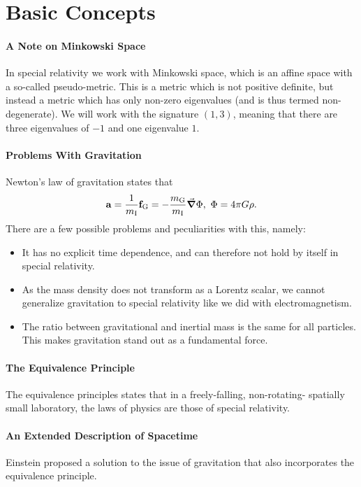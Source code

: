 \section{Basic Concepts}

\paragraph{A Note on Minkowski Space}
In special relativity we work with Minkowski space, which is an affine space with a so-called pseudo-metric. This is a metric which is not positive definite, but instead a metric which has only non-zero eigenvalues (and is thus termed non-degenerate). We will work with the signature $(1, 3)$, meaning that there are three eigenvalues of $-1$ and one eigenvalue $1$.

\paragraph{Problems With Gravitation}
Newton's law of gravitation states that
\begin{align*}
	\vb{a} = \frac{1}{m_{\text{I}}}\vb{f}_{\text{G}} = -\frac{m_{\text{G}}}{m_{\text{I}}}\grad{\Phi},\ \Phi = 4\pi G\rho.
\end{align*}
There are a few possible problems and peculiarities with this, namely:
\begin{itemize}
	\item It has no explicit time dependence, and can therefore not hold by itself in special relativity.
	\item As the mass density does not transform as a Lorentz scalar, we cannot generalize gravitation to special relativity like we did with electromagnetism.
	\item The ratio between gravitational and inertial mass is the same for all particles. This makes gravitation stand out as a fundamental force.
\end{itemize}

\paragraph{The Equivalence Principle}
The equivalence principles states that in a freely-falling, non-rotating- spatially small laboratory, the laws of physics are those of special relativity.

\paragraph{An Extended Description of Spacetime}
Einstein proposed a solution to the issue of gravitation that also incorporates the equivalence principle.

